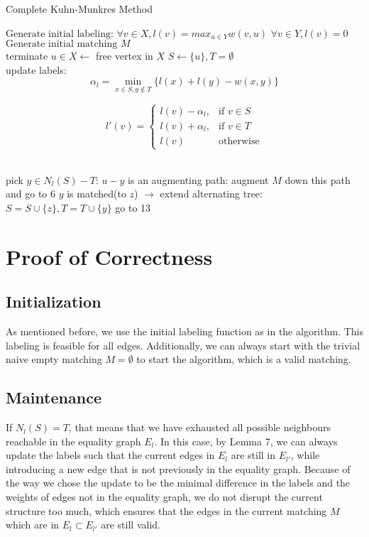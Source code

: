 \documentclass{article}
\begin{document}
\begin{algorithm}
\caption{Complete Kuhn-Munkres Method}\label{euclid}
\begin{algorithmic}[1]
\State $\text{Generate initial labeling:}$
\State\hspace{\algorithmicindent} $\text{$\forall v \in X, l(v) = max_{u \in Y} w(v, u)$}$
\State\hspace{\algorithmicindent} $\text{$\forall v \in Y, l(v) = 0 $}$
\State $\text{Generate initial matching $M$}$
\\
\State terminate
\Else
\State $u \in X \leftarrow$ free vertex in $X$
\State $S \leftarrow \{ u\}, T = \emptyset$
\EndIf
\\
  update labels:
\State \[
   \alpha_l = \min_{x \in S, y\notin T} \{ l(x) + l(y) - w(x, y) \}
\]

\State \[
    l'(v)= 
\begin{cases}
    l(v) - \alpha_l,& \text{if } v \in S\\
    l(v) + \alpha_l,& \text{if } v \in T\\
    l(v)              & \text{otherwise}
\end{cases}
\]

\EndIf
\\
  pick $y \in N_l(S) - T$:
 $u - y$ is an augmenting path:
\State augment $M$ down this path and go to 6
\Else 
\State $y$ is matched(to $z$) $\rightarrow$ extend alternating tree:
\State $S = S \cup \{ z \}, T = T \cup \{ y \}$
\State go to 13
\EndIf
\EndIf
\end{algorithmic}
\end{algorithm}

\section{Proof of Correctness}

\subsection{Initialization}

As mentioned before, we use the initial labeling function as in the algorithm. This labeling is feasible for all edges. Additionally, we can always start with the trivial naive empty matching $M = \emptyset$ to start the algorithm, which is a valid matching.

\subsection{Maintenance}
If $N_l(S) = T$, that means that we have exhausted all possible neighbours reachable in the equality graph $E_l$. In this case, by Lemma 7, we can always update the labels such that the current edges in $E_l$ are still in $E_{l'}$, while introducing a new edge that is not previously in the equality graph. Because of the way we chose the update to be the minimal difference in the labels and the weights of edges not in the equality graph, we do not disrupt the current structure too much, which ensures that the edges in the current matching $M$ which are in $E_l \subset E_{l'}$ are still valid.\\
\end{document}
